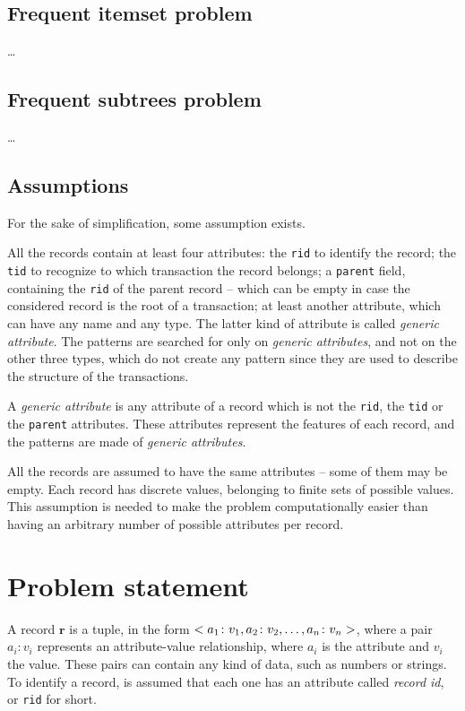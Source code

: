 \documentclass{acm_proc_article-sp-sigmod09}
\begin{document}
\subsection{Frequent itemset problem}
\dots

\subsection{Frequent subtrees problem}
\dots

\subsection{Assumptions}
\label{sec:assumptions}
For the sake of simplification, some assumption exists.

All the records contain at least four attributes: the \texttt{rid} to identify the record; the \texttt{tid} to recognize to which transaction the record belongs; a \texttt{parent} field, containing the \texttt{rid} of the parent record -- which can be empty in case the considered record is the root of a transaction; at least another attribute, which can have any name and any type. The latter kind of attribute is called \emph{generic attribute}. The patterns are searched for only on \emph{generic attributes}, and not on the other three types, which do not create any pattern since they are used to describe the structure of the transactions.

\begin{definition}
A \emph{generic attribute} is any attribute of a record which is not the \texttt{rid}, the \texttt{tid} or the \texttt{parent} attributes. These attributes represent the features of each record, and the patterns are made of \emph{generic attributes}.
\end{definition}

All the records are assumed to have the same attributes -- some of them may be empty. Each record has discrete values, belonging to finite sets of possible values. This assumption is needed to make the problem computationally easier than having an arbitrary number of possible attributes per record.

\section{Problem statement}
A record $\boldsymbol{r}$ is a tuple, in the form $<a_1 \colon v_1, a_2 \colon v_2, \text{\dots}, a_n \colon v_n>$, where a pair $a_i \colon v_i$ represents an attribute-value relationship, where $a_i$ is the attribute and $v_i$ the value. These pairs can contain any kind of data, such as numbers or strings. To identify a record, is assumed that each one has an attribute called \emph{record id}, or \texttt{rid} for short.
\end{document}

